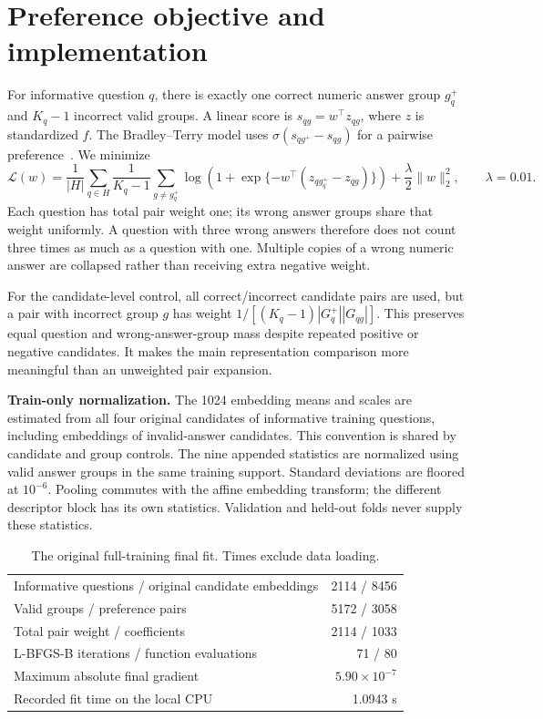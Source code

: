 \documentclass[11pt,a4paper]{article}
\newcommand{\pageheading}[1]{\section{#1}}
\begin{document}
\newpage
\pageheading{Preference objective and implementation}
For informative question $q$, there is exactly one correct numeric answer
group $g_q^+$ and $K_q-1$ incorrect valid groups. A linear score is
$s_{qg}=w^\top z_{qg}$, where $z$ is standardized $f$. The Bradley--Terry model
uses $\sigma(s_{qg^+}-s_{qg})$ for a pairwise preference~\cite{bt}. We minimize
\begin{equation}
\mathcal L(w)=\frac{1}{|H|}\sum_{q\in H}\frac{1}{K_q-1}
\sum_{g\ne g_q^+}\log\!\left(1+\exp\{-w^\top(z_{qg_q^+}-z_{qg})\}\right)
+\frac{\lambda}{2}\|w\|_2^2,\qquad \lambda=0.01.
\end{equation}
Each question has total pair weight one; its wrong answer groups share that
weight uniformly. A question with three wrong answers therefore does not count
three times as much as a question with one. Multiple copies of a wrong numeric
answer are collapsed rather than receiving extra negative weight.

For the candidate-level control, all correct/incorrect candidate pairs are
used, but a pair with incorrect group $g$ has weight
$1/[(K_q-1)|G_q^+||G_{qg}|]$. This preserves equal question and wrong-answer-group
mass despite repeated positive or negative candidates. It makes the main
representation comparison more meaningful than an unweighted pair expansion.

\textbf{Train-only normalization.} The 1024 embedding means and scales are
estimated from all four original candidates of informative training questions,
including embeddings of invalid-answer candidates. This convention is shared
by candidate and group controls. The nine appended statistics are normalized
using valid answer groups in the same training support. Standard deviations
are floored at $10^{-6}$. Pooling commutes with the affine embedding transform;
the different descriptor block has its own statistics. Validation and held-out
folds never supply these statistics.

\begin{table}[h]\centering
\caption{The original full-training final fit. Times exclude data loading.}
\begin{tabular}{lr}\toprule
Informative questions / original candidate embeddings & 2114 / 8456 \\
Valid groups / preference pairs & 5172 / 3058 \\
Total pair weight / coefficients & 2114 / 1033 \\
L-BFGS-B iterations / function evaluations & 71 / 80 \\
Maximum absolute final gradient & $5.90\times10^{-7}$ \\
Recorded fit time on the local CPU & 1.0943 s \\
\bottomrule\end{tabular}
\end{table}
\end{document}
